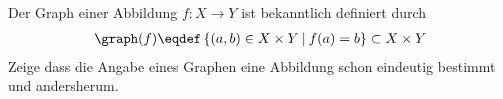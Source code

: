 \begin{exercise}
  \label{ex:graph-of-map}
  Der Graph einer Abbildung $f\colon X \rightarrow Y$ ist bekanntlich definiert
  durch
  \begin{equation*}
    \begin{split}
      \graph(f) \eqdef \left\{ (a,b) \in X\times Y \:\arrowvert\:
        f(a)=b\right\} \subset X\times Y
    \end{split}
  \end{equation*}
  Zeige dass die Angabe eines Graphen eine Abbildung schon eindeutig bestimmt
  und andersherum.
\end{exercise}
